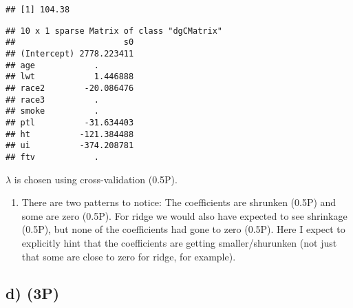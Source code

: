 \documentclass[
]{article}
\newenvironment{Shaded}{\begin{snugshade}}{\end{snugshade}}
\newcommand{\AttributeTok}[1]{\textcolor[rgb]{0.77,0.63,0.00}{#1}}
\newcommand{\DecValTok}[1]{\textcolor[rgb]{0.00,0.00,0.81}{#1}}
\newcommand{\FloatTok}[1]{\textcolor[rgb]{0.00,0.00,0.81}{#1}}
\newcommand{\FunctionTok}[1]{\textcolor[rgb]{0.00,0.00,0.00}{#1}}
\newcommand{\NormalTok}[1]{#1}
\newcommand{\OtherTok}[1]{\textcolor[rgb]{0.56,0.35,0.01}{#1}}
\newcommand{\SpecialCharTok}[1]{\textcolor[rgb]{0.00,0.00,0.00}{#1}}
\providecommand{\tightlist}{%
  \setlength{\itemsep}{0pt}\setlength{\parskip}{0pt}}
\begin{document}
\begin{Shaded}
\end{Shaded}

\begin{verbatim}
## [1] 104.38
\end{verbatim}

\begin{Shaded}
\end{Shaded}

\begin{verbatim}
## 10 x 1 sparse Matrix of class "dgCMatrix"
##                      s0
## (Intercept) 2778.223411
## age            .       
## lwt            1.446888
## race2        -20.086476
## race3          .       
## smoke          .       
## ptl          -31.634403
## ht          -121.384488
## ui          -374.208781
## ftv            .
\end{verbatim}

\(\lambda\) is chosen using cross-validation (0.5P).

\begin{enumerate}
\def\labelenumi{(\roman{enumi})}
\setcounter{enumi}{1}
\tightlist
\item
  There are two patterns to notice: The coefficients are shrunken (0.5P)
  and some are zero (0.5P). For ridge we would also have expected to see
  shrinkage (0.5P), but none of the coefficients had gone to zero
  (0.5P). Here I expect to explicitly hint that the coefficients are
  getting smaller/shurunken (not just that some are close to zero for
  ridge, for example).
\end{enumerate}

\hypertarget{d-3p}{%
\subsection{d) (3P)}\label{d-3p}}
\end{document}
